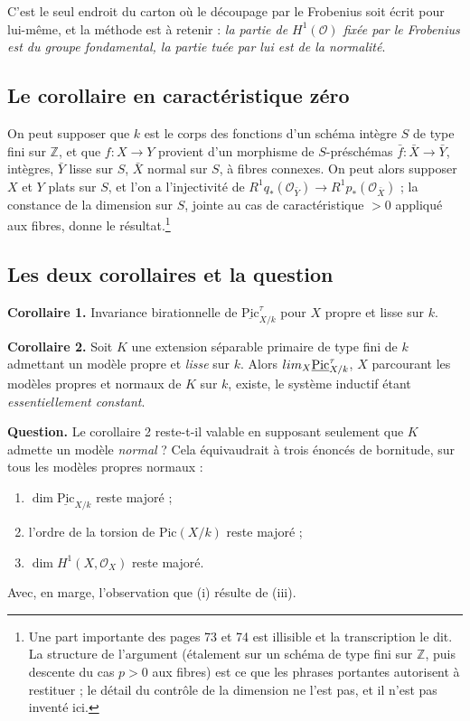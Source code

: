 \documentclass[11pt,a4paper]{article}
\begin{document}

C'est le seul endroit du carton où le découpage par le Frobenius soit écrit
pour lui-même, et la méthode est à retenir : \emph{la partie de
$H^{1}(\mathcal{O})$ fixée par le Frobenius est du groupe fondamental, la
partie tuée par lui est de la normalité}.

\subsection*{Le corollaire en caractéristique zéro}

On peut supposer que $k$ est le corps des fonctions d'un schéma intègre $S$ de
type fini sur $\mathbb{Z}$, et que $f : X \to Y$ provient d'un morphisme de
$S$-préschémas $\bar{f} : \bar{X} \to \bar{Y}$, intègres, $\bar{Y}$ lisse sur
$S$, $\bar{X}$ normal sur $S$, à fibres connexes. On peut alors supposer $X$ et
$Y$ plats sur $S$, et l'on a l'injectivité de
$R^{1}q_{*}(\mathcal{O}_{\bar{Y}}) \to R^{1}p_{*}(\mathcal{O}_{\bar{X}})$ ; la
constance de la dimension sur $S$, jointe au cas de caractéristique $> 0$
appliqué aux fibres, donne le résultat.\footnote{Une part importante des pages
73 et 74 est illisible et la transcription le dit. La structure de l'argument
(étalement sur un schéma de type fini sur $\mathbb{Z}$, puis descente du cas
$p > 0$ aux fibres) est ce que les phrases portantes autorisent à
restituer ; le détail du contrôle de la dimension ne l'est pas, et il n'est pas
inventé ici.}

\subsection*{Les deux corollaires et la question}

\textbf{Corollaire 1.} Invariance birationnelle de
$\underline{\mathrm{Pic}}^{\tau}_{X/k}$ pour $X$ propre et lisse sur $k$.

\textbf{Corollaire 2.} Soit $K$ une extension séparable primaire de type fini
de $k$ admettant un modèle propre et \emph{lisse} sur $k$. Alors
$\varinjlim_{X} \underline{\mathrm{Pic}}^{\tau}_{X/k}$, $X$ parcourant les
modèles propres et normaux de $K$ sur $k$, existe, le système inductif étant
\emph{essentiellement constant}.

\textbf{Question.} Le corollaire 2 reste-t-il valable en supposant seulement
que $K$ admette un modèle \emph{normal} ? Cela équivaudrait à trois énoncés de
bornitude, sur tous les modèles propres normaux :
\begin{enumerate}
  \item $\dim \underline{\mathrm{Pic}}_{X/k}$ reste majoré ;
  \item l'ordre de la torsion de $\mathrm{Pic}(X/k)$ reste majoré ;
  \item $\dim H^{1}(X, \mathcal{O}_{X})$ reste majoré.
\end{enumerate}
Avec, en marge, l'observation que (i) résulte de (iii).
\end{document}
